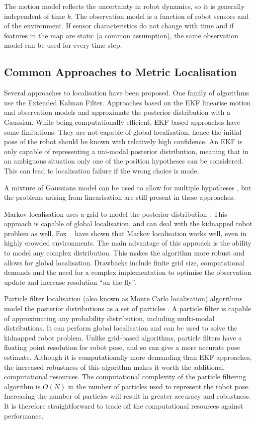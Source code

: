 The motion model reflects the uncertainty in robot dynamics, so it is
generally independent of time $k$. The observation model is a function
of robot sensors and of the environment. If sensor characteristics do
not change with time and if features in the map are static (a common
assumption), the same observation model can be used for every time
step.

\subsection{Common Approaches to Metric Localisation}

Several approaches to localisation have been proposed. One family of
algorithms use the Extended Kalman Filter\cite{Jensfelt99}. Approaches
based on the EKF linearise motion and observation models and
approximate the posterior distribution with a Gaussian. While being
computationally efficient, EKF based approaches have some
limitations. They are not capable of global localisation, hence the
initial pose of the robot should be known with relatively high
confidence. An EKF is only capable of representing a uni-modal
posterior distribution, meaning that in an ambiguous situation only
one of the position hypotheses can be considered. This can lead to
localisation failure if the wrong choice is made.

A mixture of Gaussians model can be used to allow for multiple
hypotheses \cite{JensfeltKristensen01,Cox94}, but the problems arising
from linearisation are still present in these approaches.

Markov localisation uses a grid to model the posterior distribution
\cite{Fox99}. This approach is capable of global localisation, and can
deal with the kidnapped robot problem as well. Fox \etal\ \cite{fb99}
have shown that Markov localisation works well, even in highly crowded
environments. The main advantage of this approach is the ability to
model any complex distribution. This makes the algorithm more robust
and allows for global localisation. Drawbacks include finite grid
size, computational demands and the need for a complex implementation
to optimise the observation update and increase resolution ``on the
fly''.

Particle filter localisation (also known as Monte Carlo localisation)
algorithms model the posterior distributions as a set of particles
\cite{Thrun00j, JensfeltAustinWijk00b}. A particle filter is capable of
approximating any probability distribution, including multi-modal
distributions. It can perform global localisation and can be used to
solve the kidnapped robot problem. Unlike grid-based algorithms,
particle filters have a floating point resolution for robot pose, and so
can give a more accurate pose estimate. Although it is computationally
more demanding than EKF approaches, the increased robustness of this
algorithm makes it worth the additional computational resources. The
computational complexity of the particle filtering algorithm is $O(N)$
in the number of particles used to represent the robot pose. Increasing
the number of particles will result in greater accuracy and
robustness. It is therefore straightforward to trade off the
computational resources against performance.

